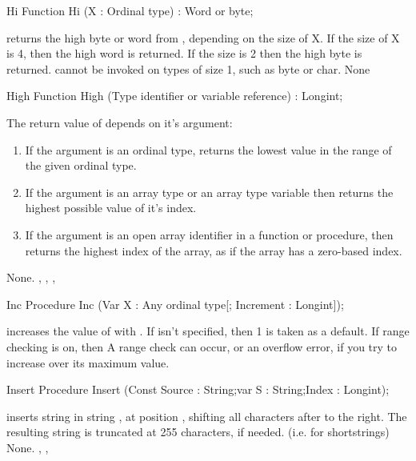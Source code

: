 \documentclass{report}
\begin{document}

\begin{function}{Hi}
\Declaration
Function Hi (X : Ordinal type) : Word or byte;

\Description
{} returns the high byte or word from , depending on the size
of X. If the size of X is 4, then the high word is returned. If the size is
2 then the high byte is returned.
 cannot be invoked on types of size 1, such as byte or char.
\Errors
None
\SeeAlso
{}
\end{function}


\begin{function}{High}
\Declaration
Function High (Type identifier or variable reference) : Longint;

\Description
 The return value of  depends on it's argument:
\begin{enumerate}
\item If the argument is an ordinal type,  returns the lowest
 value in the range of the given ordinal type.
\item If the argument is an array type or an array type variable then
 returns the highest possible value of it's index.
\item If the argument is an open array identifier in a function or
procedure, then  returns the highest index of the array, as if the
array has a zero-based index.
\end{enumerate}

\Errors
None.
\SeeAlso
{}, , , 
\end{function}


\begin{procedure}{Inc}
\Declaration
Procedure Inc (Var X : Any ordinal type[; Increment : Longint]);

\Description
{} increases the value of  with .
If  isn't specified, then 1 is taken as a default.
\Errors
If range checking is on, then A range check can occur, or an overflow 
error, if you try to increase  over its maximum value.
\SeeAlso
{}
\end{procedure}


\begin{procedure}{Insert}
\Declaration
Procedure Insert (Const Source : String;var S : String;Index : Longint);

\Description
{} inserts string  in string , at position
, shifting all characters after  to the right. The
resulting string is truncated at 255 characters, if needed. (i.e. for
shortstrings)
\Errors
None.
\SeeAlso
{}, , 
\end{procedure}
\end{document}
